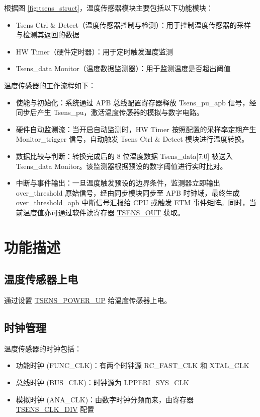 \documentclass[main\_\_CN.tex]{subfiles}
\begin{document}
根据图 \ref{fig:tsens_struct}，温度传感器模块主要包括以下功能模块：

\begin{itemize}
    \item Tsens Ctrl \& Detect（温度传感器控制与检测）：用于控制温度传感器的采样与检测其返回的数据
    \item HW Timer（硬件定时器）：用于定时触发温度监测
    \item Tsens\_data Monitor（温度数据监测器）：用于监测温度是否超出阈值
\end{itemize}

温度传感器的工作流程如下：
\begin{itemize}
    \item 使能与初始化：系统通过 APB 总线配置寄存器释放 Tsens\_pu\_apb 信号，经同步后产生 Tsens\_pu，激活温度传感器的模拟与数字电路。
    \item 硬件自动监测流：当开启自动监测时，HW Timer 按照配置的采样率定期产生 Monitor\_trigger 信号，自动触发 Tsens Ctrl \& Detect 模块进行温度转换。
    \item 数据比较与判断：转换完成后的 8 位温度数据 Tsens\_data[7:0] 被送入 Tsens\_data Monitor。该监测器根据预设的数字阈值进行实时比对。
    \item 中断与事件输出：一旦温度触发预设的边界条件，监测器立即输出 over\_threshold 原始信号，经由同步模块同步至 APB 时钟域，最终生成 over\_threshold\_apb 中断信号汇报给 CPU 或触发 ETM 事件矩阵。同时，当前温度值亦可通过软件读寄存器 \hyperref[fielddesc:TSENSOUT]{TSENS\_OUT} 获取。
\end{itemize}

\section{功能描述}

\subsection{温度传感器上电}

通过设置 \hyperref[fielddesc:TSENSPOWERUP]{TSENS\_POWER\_UP} 给温度传感器上电。

\subsection{时钟管理}

温度传感器的时钟包括：
\begin{itemize}
    \item 功能时钟 (FUNC\_CLK)：有两个时钟源 RC\_FAST\_CLK 和 XTAL\_CLK
    \item 总线时钟 (BUS\_CLK)：时钟源为 LPPERI\_SYS\_CLK
    \item 模拟时钟 (ANA\_CLK)：由数字时钟分频而来，由寄存器 \hyperref[fielddesc:TSENSCLKDIV]{TSENS\_CLK\_DIV} 配置
\end{itemize}
\end{document}
